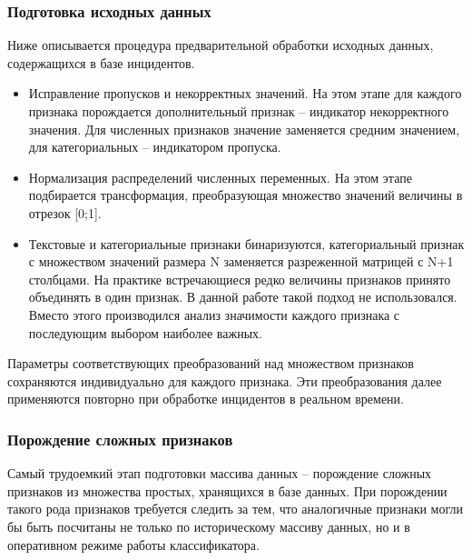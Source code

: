 \subsubsection{Подготовка исходных данных}
Ниже описывается процедура предварительной обработки исходных данных, содержащихся в базе инцидентов.
\begin{itemize}
\item Исправление пропусков и некорректных значений. На этом этапе для каждого признака порождается дополнительный признак – индикатор некорректного значения. Для численных признаков значение заменяется средним значением, для категориальных – индикатором пропуска.
\item Нормализация распределений численных переменных. На этом этапе подбирается трансформация, преобразующая множество значений величины в отрезок [0;1]. 
\item Текстовые и категориальные признаки бинаризуются, категориальный признак с множеством значений размера N заменяется разреженной матрицей с N+1 столбцами. На практике встречающиеся редко величины признаков принято объединять в один признак. В данной работе такой подход не использовался. Вместо этого производился анализ значимости каждого признака с последующим выбором наиболее важных.
\end{itemize}

Параметры соответствующих преобразований над множеством признаков сохраняются индивидуально для каждого признака. Эти преобразования далее применяются повторно при обработке инцидентов в реальном времени.

\subsubsection{Порождение сложных признаков}
Самый трудоемкий этап подготовки массива данных – порождение сложных признаков из множества простых, хранящихся в базе данных. При порождении такого рода признаков требуется следить за тем, что аналогичные признаки могли бы быть посчитаны не только по историческому массиву данных, но и в оперативном режиме работы классификатора. 

